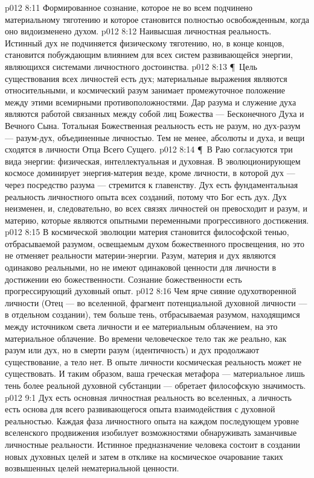 \vs p012 8:11 \bibnobreakspace {} Формированное сознание, которое не во всем подчинено материальному тяготению и которое становится полностью освобожденным, когда оно видоизменено духом.
\vs p012 8:12 \bibnobreakspace {} Наивысшая личностная реальность. Истинный дух не подчиняется физическому тяготению, но, в конце концов, становится побуждающим влиянием для всех систем развивающейся энергии, являющихся системами личностного достоинства.
\vs p012 8:13 \P\ Цель существования всех личностей есть дух; материальные выражения являются относительными, и космический разум занимает промежуточное положение между этими всемирными противоположностями. Дар разума и служение духа являются работой связанных между собой лиц Божества --- Бесконечного Духа и Вечного Сына. Тотальная Божественная реальность есть не разум, но дух\hyp{}разум --- разум\hyp{}дух, объединенные личностью. Тем не менее, абсолюты и духа, и вещи сходятся в личности Отца Всего Сущего.
\vs p012 8:14 \P\ В Раю согласуются три вида энергии: физическая, интеллектуальная и духовная. В эволюционирующем космосе доминирует энергия\hyp{}материя везде, кроме личности, в которой дух --- через посредство разума --- стремится к главенству. Дух есть фундаментальная реальность личностного опыта всех созданий, потому что Бог есть дух. Дух неизменен, и, следовательно, во всех связях личностей он превосходит и разум, и материю, которые являются опытными переменными прогрессивного достижения.
\vs p012 8:15 В космической эволюции материя становится философской тенью, отбрасываемой разумом, освещаемым духом божественного просвещения, но это не отменяет реальности материи\hyp{}энергии. Разум, материя и дух являются одинаково реальными, но не имеют одинаковой ценности для личности в достижении ею божественности. Сознание божественности есть прогрессирующий духовный опыт.
\vs p012 8:16 Чем ярче сияние одухотворенной личности (Отец --- во вселенной, фрагмент потенциальной духовной личности --- в отдельном создании), тем больше тень, отбрасываемая разумом, находящимся между источником света личности и ее материальным облачением, на это материальное облачение. Во времени человеческое тело так же реально, как разум или дух, но в смерти разум (идентичность) и дух продолжают существование, а тело нет. В опыте личности космическая реальность может не существовать. И таким образом, ваша греческая метафора --- материальное лишь тень более реальной духовной субстанции --- обретает философскую значимость.
\vs p012 9:1 Дух есть основная личностная реальность во вселенных, а личность есть основа для всего развивающегося опыта взаимодействия с духовной реальностью. Каждая фаза личностного опыта на каждом последующем уровне вселенского продвижения изобилует возможностями обнаруживать заманчивые личностные реальности. Истинное предназначение человека состоит в создании новых духовных целей и затем в отклике на космическое очарование таких возвышенных целей нематериальной ценности.
